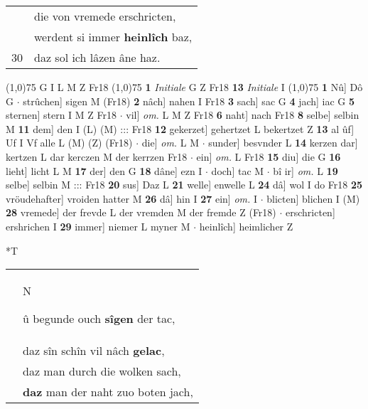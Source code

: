 \documentclass[8pt,a4paper,notitlepage]{article}
\begin{document}
\begin{table}[ht]
\begin{minipage}[t]{0.5\linewidth}
\begin{tabular}{rl}
 & die von vremede erschricten,\\ 
 & werdent si immer \textbf{heinlîch} baz,\\ 
30 & daz sol ich lâzen âne haz.\\ 
\end{tabular}
\scriptsize
\line(1,0){75} \newline
G I L M Z Fr18 \newline
\line(1,0){75} \newline
\textbf{1} \textit{Initiale} G Z Fr18  \textbf{13} \textit{Initiale} I  \newline
\line(1,0){75} \newline
\textbf{1} Nû] Dô G  $\cdot$ strûchen] sigen M (Fr18) \textbf{2} nâch] nahen I Fr18 \textbf{3} sach] sac G \textbf{4} jach] iac G \textbf{5} sternen] stern I M Z Fr18  $\cdot$ vil] \textit{om.} L M Z Fr18 \textbf{6} naht] nach Fr18 \textbf{8} selbe] selbin M \textbf{11} dem] den I (L) (M) ::: Fr18 \textbf{12} gekerzet] gehertzet L bekertzet Z \textbf{13} al ûf] Uf I Vf alle L (M) (Z) (Fr18)  $\cdot$ die] \textit{om.} L M  $\cdot$ sunder] besvnder L \textbf{14} kerzen dar] kertzen L dar kerczen M der kerrzen Fr18  $\cdot$ ein] \textit{om.} L Fr18 \textbf{15} diu] die G \textbf{16} lieht] licht L M \textbf{17} der] den G \textbf{18} dâne] ezn I  $\cdot$ doch] tac M  $\cdot$ bî ir] \textit{om.} L \textbf{19} selbe] selbin M ::: Fr18 \textbf{20} sus] Daz L \textbf{21} welle] enwelle L \textbf{24} dâ] wol I do Fr18 \textbf{25} vröudehafter] vroiden hatter M \textbf{26} dâ] hin I \textbf{27} ein] \textit{om.} I  $\cdot$ blicten] blichen I (M) \textbf{28} vremede] der frevde L der vremden M der fremde Z (Fr18)  $\cdot$ erschricten] ershrichen I \textbf{29} immer] niemer L myner M  $\cdot$ heinlîch] heimlicher Z \newline
\end{minipage}
\hspace{0.5cm}
\begin{minipage}[t]{0.5\linewidth}
\small
\begin{center}*T
\end{center}
\begin{tabular}{rl}
 & \begin{large}N\end{large}û begunde ouch \textbf{sîgen} der tac,\\ 
 & daz sîn schîn vil nâch \textbf{gelac},\\ 
 & daz man durch die wolken sach,\\ 
 & \textbf{daz} man der naht zuo boten jach,\\ 

\end{tabular}
\end{minipage}
\end{table}
\end{document}
